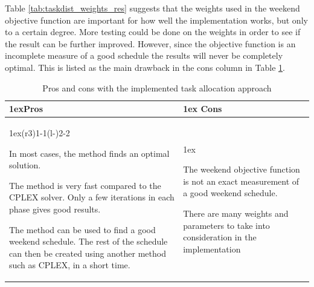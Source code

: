 Table \ref{tab:taskdist_weights_res} suggests that the weights used in the weekend objective function are important for how well the implementation works, but only to a certain degree. More testing could be done on the weights in order to see if the result can be further improved. However, since the objective function is an incomplete measure of a good schedule the results will never be completely optimal. This is listed as the main drawback in the cons column in Table \ref{tab:pros_cons_task_scheduling}. 

\begin{table}[!ht]
\caption{Pros and cons with the implemented task allocation approach}
\label{tab:pros_cons_task_scheduling}
\begin{tabularx}{\linewidth}{>{\parskip1ex}X@{\kern4\tabcolsep}>{\parskip1ex}X}
\toprule
\hfil\bfseries Pros
&
\hfil\bfseries Cons
\\\cmidrule(r{3\tabcolsep}){1-1}\cmidrule(l{-\tabcolsep}){2-2}

In most cases, the method finds an optimal solution. \par
The method is very fast compared to the CPLEX solver. Only a few iterations in each phase gives good results. \par
The method can be used to find a good weekend schedule. The rest of the schedule can then be created using another method such as CPLEX, in a short time. \par

&

The weekend objective function is not an exact measurement of a good weekend schedule. \par
There are many weights and parameters to take into consideration in the implementation \par


\\\bottomrule
\end{tabularx}
\end{table}

